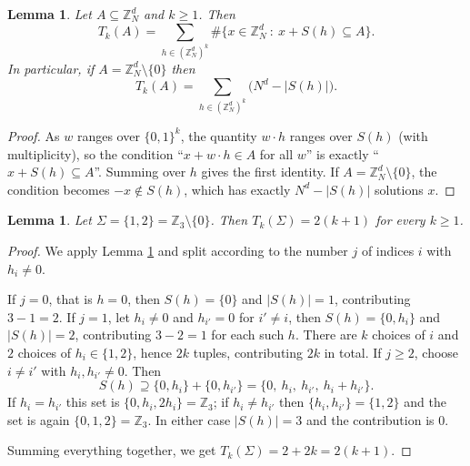 \documentclass[12pt]{amsart}
\newcommand{\Z}{\mathbb{Z}}
\newtheorem{lemma}[theorem]{Lemma}
\begin{document}
\begin{lemma}\label{lem:subsetsums}
Let $A\subseteq\Z_N^d$ and $k\ge1$. Then
\[
T_k(A)=\sum_{h\in(\Z_N^d)^k}\#\bigl\{x\in\Z_N^d\ :\ x+S(h)\subseteq A\bigr\}.
\]
In particular, if $A=\Z_N^d\setminus\{0\}$ then
\[
T_k(A)=\sum_{h\in(\Z_N^d)^k}\bigl(N^d-|S(h)|\bigr).
\]
\end{lemma}

\begin{proof}
As $w$ ranges over $\{0,1\}^k$, the quantity $w\cdot h$ ranges over $S(h)$ (with multiplicity), so the condition ``$x+w\cdot h\in A$ for all $w$'' is exactly ``$x+S(h)\subseteq A$''. Summing over $h$ gives the first identity. If $A=\Z_N^d\setminus\{0\}$, the condition becomes $-x\notin S(h)$, which has exactly $N^d-|S(h)|$ solutions $x$.
\end{proof}

\begin{lemma}\label{lem:Z3count}
Let $\Sigma=\{1,2\}=\Z_3\setminus\{0\}$. Then $T_k(\Sigma)=2(k+1)$ for every $k\ge1$.
\end{lemma}

\begin{proof}
We apply Lemma \ref{lem:subsetsums} and split according to the number $j$ of indices $i$ with $h_i\ne0$.

If $j=0$, that is $h=0$, then $S(h)=\{0\}$ and $|S(h)|=1$, contributing $3-1=2$.
If $j=1$, let $h_i\ne0$ and $h_{i'}=0$ for $i'\ne i$, then $S(h)=\{0,h_i\}$ and $|S(h)|=2$, contributing $3-2=1$ for each such $h$. There are $k$ choices of $i$ and $2$ choices of $h_i\in\{1,2\}$, hence $2k$ tuples, contributing $2k$ in total.
If $j\ge2$, choose $i\ne i'$ with $h_i,h_{i'}\ne0$. Then
\[
S(h)\supseteq\{0,h_i\}+\{0,h_{i'}\}=\{0,\ h_i,\ h_{i'},\ h_i+h_{i'}\}.
\]
If $h_i=h_{i'}$ this set is $\{0,h_i,2h_i\}=\Z_3$; if $h_i\ne h_{i'}$ then $\{h_i,h_{i'}\}=\{1,2\}$ and the set is again $\{0,1,2\}=\Z_3$. In either case $|S(h)|=3$ and the contribution is $0$.

Summing everything together, we get $T_k(\Sigma)=2+2k=2(k+1)$.
\end{proof}
\end{document}

